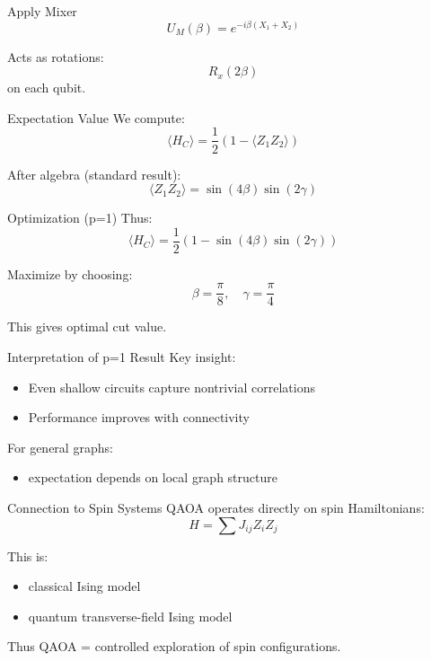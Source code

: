 \documentclass{beamer}
\begin{document}
\begin{frame}{Apply Mixer}
\[
U_M(\beta) = e^{-i\beta (X_1 + X_2)}
\]

Acts as rotations:
\[
R_x(2\beta)
\]
on each qubit.
\end{frame}

\begin{frame}{Expectation Value}
We compute:
\[
\langle H_C \rangle =
\frac{1}{2}(1 - \langle Z_1 Z_2 \rangle)
\]

After algebra (standard result):
\[
\langle Z_1 Z_2 \rangle =
\sin(4\beta)\sin(2\gamma)
\]
\end{frame}

\begin{frame}{Optimization (p=1)}
Thus:
\[
\langle H_C \rangle =
\frac{1}{2}(1 - \sin(4\beta)\sin(2\gamma))
\]

Maximize by choosing:
\[
\beta = \frac{\pi}{8}, \quad \gamma = \frac{\pi}{4}
\]

This gives optimal cut value.
\end{frame}

\begin{frame}{Interpretation of p=1 Result}
Key insight:
\begin{itemize}
\item Even shallow circuits capture nontrivial correlations
\item Performance improves with connectivity
\end{itemize}

For general graphs:
\begin{itemize}
\item expectation depends on local graph structure
\end{itemize}
\end{frame}

\begin{frame}{Connection to Spin Systems}
QAOA operates directly on spin Hamiltonians:
\[
H = \sum J_{ij} Z_i Z_j
\]

This is:
\begin{itemize}
\item classical Ising model
\item quantum transverse-field Ising model
\end{itemize}

Thus QAOA = controlled exploration of spin configurations.
\end{frame}
\end{document}
